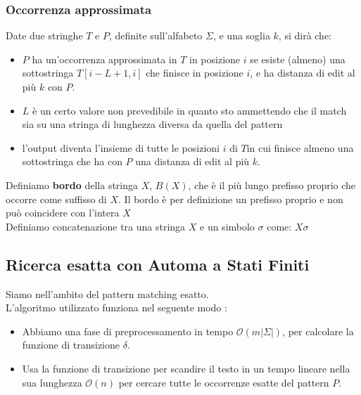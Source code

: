 \subsubsection{Occorrenza approssimata}
Date due stringhe $T$ e $P$, definite sull'alfabeto $\Sigma$, e una soglia $k$, si dirà che:
\begin{itemize}
    \item $P$ ha un’occorrenza approssimata in $T$ in posizione $i$ se esiste (almeno) una sottostringa $T[i-L+1,i]$ che finisce in posizione $i$, e ha distanza di edit al più $k$ con $P$. 
    \item $L$ è un certo valore non prevedibile in quanto sto ammettendo che il match sia su una stringa di lunghezza diversa da quella del pattern
    \item l'output diventa l'insieme di tutte le posizioni $i$ di $T$in cui finisce almeno una sottostringa che ha con $P$ una distanza di edit al più $k$.
\end{itemize}
Definiamo \textbf{bordo} della stringa $X$, $B(X)$, che è il più lungo prefisso proprio che occorre come suffisso di $X$.
Il bordo è per definizione un prefisso proprio e non può coincidere con l’intera $X$ \\ 
Definiamo concatenazione tra una stringa $X$ e un simbolo $\sigma$ come: $X\sigma$

\subsection{Ricerca esatta con Automa a Stati Finiti}
Siamo nell'ambito del pattern matching esatto.\\
L'algoritmo utilizzato funziona nel seguente modo :
\begin{itemize}
    \item Abbiamo una fase di preprocessamento in tempo $\mathcal{O}(m|\Sigma|)$, per calcolare la funzione di transizione $\delta$.
    \item Usa la funzione di transizione per scandire  il testo in un tempo lineare nella sua lunghezza $\mathcal{O}(n)$ per cercare tutte le occorrenze esatte del pattern $P$. 
\end{itemize}

